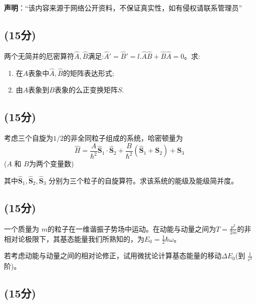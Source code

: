 
\textbf{声明}：“该内容来源于网络公开资料，不保证真实性，如有侵权请联系管理员”

\subsection{(15分)}
两个无简并的厄密算符$\hat{A},\hat{B}$满足:$\hat{A}'=\hat{B}'=l$.$\hat{A}\hat{B}+\hat{B}\hat{A}=0$。求:
\begin{enumerate}
\item 在$A$表象中$\hat{A},\hat{B}$的矩阵表达形式;
\item 由$A$表象到$B$表象的么正变换矩阵$S$.
\end{enumerate}
\subsection{(15分)}
考虑三个自旋为$1/2$的非全同粒子组成的系统，哈密顿量为$$\hat{H} = \frac{A}{\hbar^2} \hat{\mathbf{S}}_1 \cdot \hat{\mathbf{S}}_2 + \frac{B}{\hbar^2} (\hat{\mathbf{S}}_1  + \hat{\mathbf{S}}_2)+\hat{\mathbf{S}}_3~$$ ($A$ 和 $B$为两个变量数)

其中$\hat{\mathbf{S}}_1, \hat{\mathbf{S}}_2, \hat{\mathbf{S}}_3$ 分别为三个粒子的自旋算符。求该系统的能级及能级简并度。
\subsection{(15分)}
 一个质量为 $m$的粒子在一维谐振子势场中运动。在动能与动量之间为$T = \frac{p^2}{2m}$的非相对论极限下，其基态能量我们所熟知的，为$E_0 = \frac{1}{2}\hbar\omega$。

若考虑动能与动量之间的相对论修正，试用微扰论计算基态能量的移动$\Delta E_0$(到 $\frac{1}{c^2}$阶)。
\subsection{(15分)}